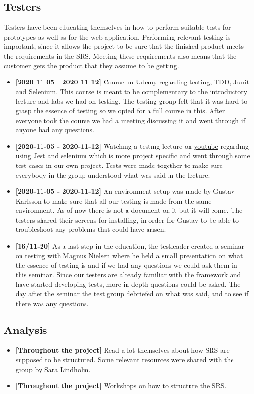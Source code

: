 \documentclass[12pt]{article}
\begin{document}
\subsection{Testers}
Testers have been educating themselves in how to perform suitable tests for prototypes as well as for the web application. Performing relevant testing is important, since it allows the project to be sure that the finished product meets the requirements in the SRS. Meeting these requirements also means that the customer gets the product that they assume to be getting.
\begin{itemize}
    \item \textbf{[2020-11-05 - 2020-11-12]} \href{(https://www.udemy.com/course/what-a-java-software-developer-must-know-about-testing/)} {Course on Udemy regarding testing, TDD, Junit and Selenium.} This course is meant to be complementary to the introductory lecture and labs we had on testing. The testing group felt that it was hard to grasp the essence of testing so we opted for a full course in this. After everyone took the course we had a meeting discussing it and went through if anyone had any questions. 
    \item \textbf{[2020-11-05 - 2020-11-12]} Watching a testing lecture on  \href{(https://www.youtube.com/watch?v=mRW2E8uweEc)}{youtube} regarding using Jest and selenium which is more project specific and went through some test cases in our own project. Tests were made together to make sure everybody in the group understood what was said in the lecture. 
    \item \textbf{[2020-11-05 - 2020-11-12]} An environment setup was made by Gustav Karlsson to make sure that all our testing is made from the same environment. As of now there is not a document on it but it will come. The testers shared their screens for installing, in order for Gustav to be able to troubleshoot any problems that could have arisen. 
    \item \textbf{[16/11-20]} As a last step in the education, the testleader created a seminar on testing with Magnus Nielsen where he held a small presentation on what the essence of testing is and if we had any questions we could ask them in this seminar. Since our testers are already familiar with the framework and have started developing tests, more in depth questions could be asked. The day after the seminar the test group debriefed on what was said, and to see if there was any questions. 
\end{itemize}

\subsection{Analysis}
\begin{itemize}
    \item \textbf{[Throughout the project]} Read a lot themselves about how SRS are supposed to be structured. Some relevant resources were shared with the group by Sara Lindholm. 
    \item \textbf{[Throughout the project]} Workshops on how to structure the SRS. 
\end{itemize}
\end{document}
